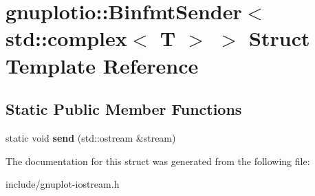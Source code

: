 \hypertarget{structgnuplotio_1_1BinfmtSender_3_01std_1_1complex_3_01T_01_4_01_4}{}\section{gnuplotio\+:\+:Binfmt\+Sender$<$ std\+:\+:complex$<$ T $>$ $>$ Struct Template Reference}
\label{structgnuplotio_1_1BinfmtSender_3_01std_1_1complex_3_01T_01_4_01_4}
\subsection*{Static Public Member Functions}
\begin{DoxyCompactItemize}
\item 
\mbox{\label{structgnuplotio_1_1BinfmtSender_3_01std_1_1complex_3_01T_01_4_01_4_a64633d068c93ef2822ee3aa6ef39d623}} 
static void {\bfseries send} (std\+::ostream \&stream)
\end{DoxyCompactItemize}


The documentation for this struct was generated from the following file\+:\begin{DoxyCompactItemize}
\item 
include/gnuplot-\/iostream.\+h\end{DoxyCompactItemize}
